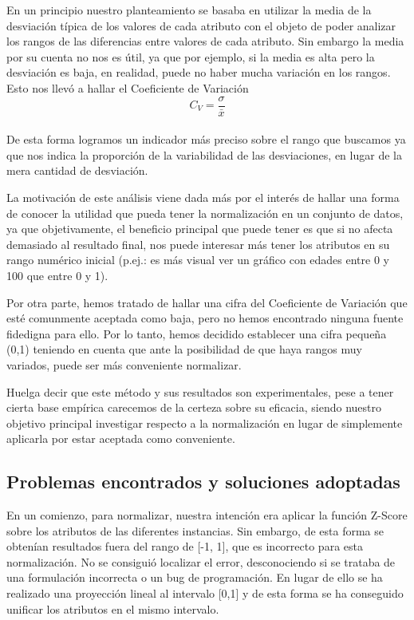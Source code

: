 \documentclass[10pt,a4paper]{article}
\begin{document}
En un principio nuestro planteamiento se basaba en utilizar la media de la desviación típica de los valores de cada atributo con el objeto de poder analizar los rangos 
de las diferencias entre valores de cada atributo. Sin embargo la media por su cuenta no nos es útil, ya que por ejemplo, si la media es alta pero la desviación es baja, 
en realidad, puede no haber mucha variación en los rangos. Esto nos llevó a
hallar el Coeficiente de Variación\\

\begin{equation}
C_{V}=\frac{\sigma}{\bar{x}}
 \end{equation}\\

De esta forma logramos un indicador más preciso sobre el rango que buscamos ya que nos indica la proporción de la variabilidad de las desviaciones, en lugar de la mera 
cantidad de desviación.

La motivación de este análisis viene dada más por el interés de hallar una forma de conocer la utilidad que pueda tener la normalización en un conjunto de datos, ya que
 objetivamente, el beneficio principal que puede tener es que si no afecta demasiado al resultado final, nos puede interesar más tener los atributos en su rango numérico inicial (p.ej.: es más visual ver un gráfico con edades entre 0 y 100 que entre 0 y 1).

Por otra parte, hemos tratado de hallar una cifra del Coeficiente de Variación que esté comunmente aceptada como baja, pero no hemos encontrado ninguna fuente fidedigna 
para ello. Por lo tanto, hemos decidido establecer una cifra pequeña (0,1) teniendo en cuenta que ante la posibilidad de que haya rangos muy variados, puede ser más 
conveniente normalizar.

Huelga decir que este método y sus resultados son experimentales, pese a tener cierta base empírica carecemos de la certeza sobre su eficacia, siendo nuestro objetivo 
principal investigar respecto a la normalización en lugar de simplemente aplicarla por estar aceptada como conveniente. 


\subsection{Problemas encontrados y soluciones adoptadas}


En un comienzo, para normalizar, nuestra intención era aplicar la función Z-Score sobre los atributos de las diferentes instancias. Sin embargo, de esta forma se 
obtenían resultados fuera del rango de [-1, 1], que es incorrecto para esta normalización. No se consiguió localizar el error, desconociendo si se trataba de una
 formulación incorrecta o un bug de programación. En lugar de ello se ha realizado una proyección lineal al intervalo [0,1] y de esta forma se ha conseguido 
 unificar los atributos en el mismo intervalo.
\end{document}
